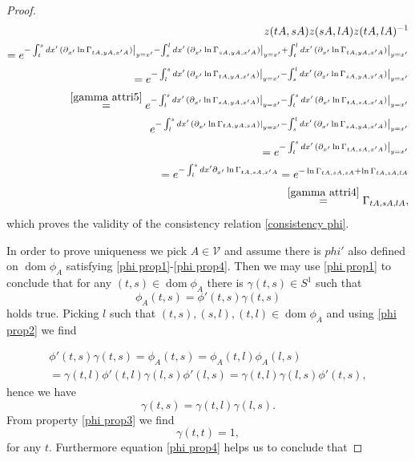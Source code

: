 \documentclass[b5paper,draft,openbib,12pt]{memoir}
\DeclareMathOperator{\dom}{dom}
\begin{document}
\begin{proof}
\begin{align}
z(tA,sA) z(sA,lA)z(tA,lA)^{-1}\\
=e^{-\int_t^s d x' \left.(\partial_{x'} \ln \Gamma_{tA,yA,x'A} )\right|_{y=x'}  -\int_s^l d x' \left.(\partial_{x'} \ln \Gamma_{sA,yA,x'A} )\right|_{y=x'}  +\int_t^l d x' \left.(\partial_{x'} \ln \Gamma_{tA,yA,x'A} )\right|_{y=x'}  }\\
=e^{-\int_l^s d x' \left.(\partial_{x'} \ln \Gamma_{tA,yA,x'A} )\right|_{y=x'}  -\int_s^l d x' \left.(\partial_{x'} \ln \Gamma_{sA,yA,x'A} )\right|_{y=x'} }\\
\overset{\eqref{gamma attri5}}{=}
e^{-\int_l^s d x' \left.(\partial_{x'} \ln \Gamma_{sA,yA,x'A} )\right|_{y=x'} 
-\int_l^s d x' \left.(\partial_{x'} \ln \Gamma_{tA,sA,x'A} )\right|_{y=x'}}\\ 
e^{-\int_l^s d x' \left.(\partial_{x'} \ln \Gamma_{tA,yA,sA} )\right|_{y=x'} 
 -\int_s^l d x' \left.(\partial_{x'} \ln \Gamma_{sA,yA,x'A} )\right|_{y=x'} }\\
 =e^{-\int_l^s d x' \left.(\partial_{x'} \ln \Gamma_{tA,sA,x'A} )\right|_{y=x'}}\\
  =e^{-\int_l^s d x'\partial_{x'} \ln \Gamma_{tA,sA,x'A} }=e^{-\ln \Gamma_{t A, s A, s A} + \ln\Gamma_{t A, s A, l A}}\\
  \overset{\eqref{gamma attri4}}{=}\Gamma_{t A, s A, l A},
\end{align}
which proves the validity of the consistency relation \eqref{consistency phi}.

In order to prove uniqueness we pick \(A\in \mathcal{V}\) and assume there is \(phi'\) also defined on \(\dom \phi_A\) 
satisfying \eqref{phi prop1}-\eqref{phi prop4}. Then we may use \eqref{phi prop1} to conclude that for any \((t,s)\in\dom\phi_A\) there is
\(\gamma(t,s)\in S^1\) such that
\begin{equation}
\phi_A(t,s)=\phi'(t,s) \gamma(t,s)
\end{equation}
holds true. Picking \(l\) such that \((t,s),(s,l),(t,l)\in \dom\phi_A\) and  using \eqref{phi prop2} we find

\begin{align}
\phi'(t,s) \gamma(t,s)=\phi_A(t,s)=\phi_A(t,l)\phi_A(l,s)\\
=\gamma(t,l)\phi'(t,l) \gamma(l,s)\phi'(l,s)=\gamma(t,l) \gamma(l,s)\phi'(t,s) ,
\end{align}
hence we have
\begin{equation}
 \gamma(t,s)=\gamma(t,l) \gamma(l,s).
\end{equation}
From property \eqref{phi prop3} we find
\begin{equation}
\gamma(t,t)=1,
\end{equation}
for any \(t\).
Furthermore equation \eqref{phi prop4} helps us to conclude that 


\end{proof}
\end{document}
